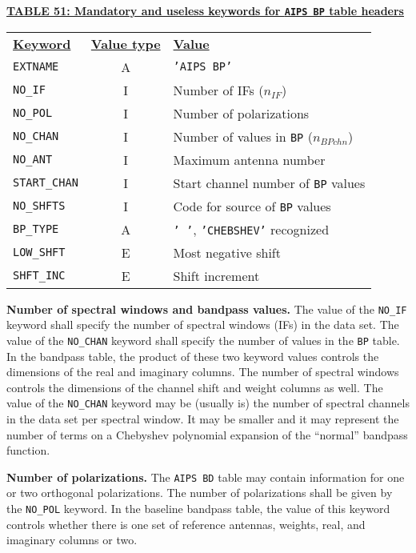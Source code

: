 \documentclass[twoside]{article}
\newcommand{\nif}{$n_{IF}$}
\newcommand{\bpchan}{$n_{BPchn}$}
\begin{document}
\begin{center}
\underline{\bf{TABLE 51: Mandatory and useless keywords for {\tt AIPS
      BP} table headers}}\\
\begin{tabular}{lcl}
\noalign{\vspace{2pt}} \label{ta:BPkeys}
\underline{{\bf Keyword}} & \underline{\bf{Value type}} &
    \underline{\bf{Value\vphantom{y}}} \\
\noalign{\vspace{2pt}}
{\tt EXTNAME}     & A & {\tt 'AIPS BP'}  \\
{\tt NO\_IF}      & I & Number of IFs (\nif)\\
{\tt NO\_POL}     & I & Number of polarizations \\
{\tt NO\_CHAN}    & I & Number of values in {\tt BP} (\bpchan) \\
{\tt NO\_ANT}     & I & Maximum antenna number \\
{\tt START\_CHAN} & I & Start channel number of {\tt BP} values \\
{\tt NO\_SHFTS}   & I & Code for source of {\tt BP} values \\
{\tt BP\_TYPE}    & A & {\tt ' '}, {\tt 'CHEBSHEV'} recognized \\
\hline
{\tt LOW\_SHFT}   & E & Most negative shift \\
{\tt SHFT\_INC}   & E & Shift increment
\end{tabular}
\end{center}

{\bf Number of spectral windows and bandpass values.} The value of the
{\tt NO\_IF} keyword shall specify the number of spectral windows
(IFs) in the data set.  The value of the {\tt NO\_CHAN} keyword shall
specify the number of values in the {\tt BP} table.  In the bandpass
table, the product of these two keyword values controls the dimensions
of the real and imaginary columns.  The number of spectral windows
controls the dimensions of the channel shift and weight columns as
well.  The value of the {\tt NO\_CHAN} keyword may be (usually is) the
number of spectral channels in the data set per spectral window.  It
may be smaller and it may represent the number of terms on a Chebyshev
polynomial expansion of the ``normal'' bandpass function.

{\bf Number of polarizations.}  The {\tt AIPS BD} table may contain
information for one or two orthogonal polarizations.  The number of
polarizations shall be given by the {\tt NO\_POL} keyword.   In the
baseline bandpass table, the value of this keyword controls whether
there is one set of reference antennas, weights, real, and imaginary
columns or two.
\end{document}
